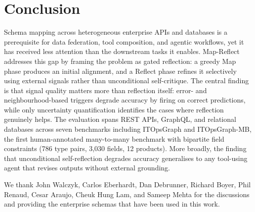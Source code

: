 \documentclass[sigconf, nonacm]{acmart}
\begin{document}
\section{Conclusion}

Schema mapping across heterogeneous enterprise APIs and databases is a prerequisite for data federation, tool composition, and agentic workflows, yet it has received less attention than the downstream tasks it enables. Map-Reflect addresses this gap by framing the problem as gated reflection: a greedy Map phase produces an initial alignment, and a Reflect phase refines it selectively using external signals rather than unconditional self-critique. The central finding is that signal quality matters more than reflection itself: error- and neighbourhood-based triggers degrade accuracy by firing on correct predictions, while only uncertainty quantification identifies the cases where reflection genuinely helps. The evaluation spans REST APIs, GraphQL, and relational databases across seven benchmarks including ITOpsGraph and ITOpsGraph-MB, the first human-annotated many-to-many benchmark with bipartite field constraints (786 type pairs, 3,030 fields, 12 products). More broadly, the finding that unconditional self-reflection degrades accuracy generalises to any tool-using agent that revises outputs without external grounding.

\balance
\clearpage
\begin{acks}
We thank John Walczyk, Carlos Eberhardt, Dan Debrunner, Richard Boyer, Phil Renaud, Cesar Araujo, Cheuk Hung Lam, and Sameep Mehta for the discussions and providing the enterprise schemas that have been used in this work.
\end{acks}



\end{document}
